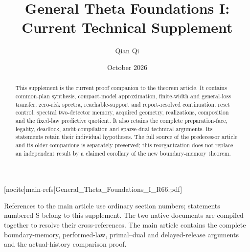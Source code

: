 
[nocite]{main-refs}[General_Theta_Foundations_I_R66.pdf]
\renewcommand{\thesection}{S\arabic{section}}
\title[Current technical supplement]{General Theta Foundations I:\\Current Technical Supplement}
\author{Qian Qi}\date{October 2026}

\begin{abstract}
This supplement is the current proof companion to the theorem article. It contains common-plan synthesis, compact-model approximation, finite-width and general-loss transfer, zero-risk spectra, reachable-support and report-resolved continuation, reset control, spectral two-detector memory, acquired geometry, realizations, composition and the fixed-law predictive quotient. It also retains the complete preparation-face, legality, deadlock, audit-compilation and sparse-dual technical arguments. Its statements retain their individual hypotheses. The full source of the predecessor article and its older companions is separately preserved; this reorganization does not replace an independent result by a claimed corollary of the new boundary-memory theorem.
\end{abstract}
\maketitle
\enlargethispage{3pt}
\noindent References to the main article use ordinary section numbers; statements numbered S belong to this supplement. The two native documents are compiled together to resolve their cross-references. The main article contains the complete boundary-memory, performed-law, primal--dual and delayed-release arguments and the actual-history comparison proof.




















